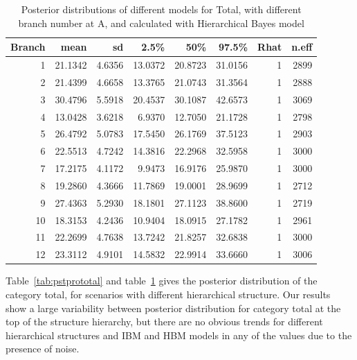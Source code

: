 \begin{table}[!h]
	\centering
	\begin{tabular}{rrrrrrrr}
		\hline
		Branch & mean & sd & 2.5\% & 50\% & 97.5\% & Rhat & n.eff \\ 
		\hline
		1 & 21.1342 & 4.6356 & 13.0372 & 20.8723 & 31.0156 & 1 & 2899 \\ 
		2 & 21.4399 & 4.6658 & 13.3765 & 21.0743 & 31.3564 & 1 & 2888 \\ 
		3 & 30.4796 & 5.5918 & 20.4537 & 30.1087 & 42.6573 & 1 & 3069 \\ 
		4 & 13.0428 & 3.6218 & 6.9370 & 12.7050 & 21.1728 & 1 & 2798 \\ 
		5 & 26.4792 & 5.0783 & 17.5450 & 26.1769 & 37.5123 & 1 & 2903 \\ 
		6 & 22.5513 & 4.7242 & 14.3816 & 22.2968 & 32.5958 & 1 & 3000 \\ 
		7 & 17.2175 & 4.1172 & 9.9473 & 16.9176 & 25.9870 & 1 & 3000 \\ 
		8 & 19.2860 & 4.3666 & 11.7869 & 19.0001 & 28.9699 & 1 & 2712 \\ 
		9 & 27.4363 & 5.2930 & 18.1801 & 27.1123 & 38.8600 & 1 & 2719 \\ 
		10 & 18.3153 & 4.2436 & 10.9404 & 18.0915 & 27.1782 & 1 & 2961 \\ 
		11 & 22.2699 & 4.7638 & 13.7242 & 21.8257 & 32.6838 & 1 & 3000 \\ 
		12 & 23.3112 & 4.9101 & 14.5832 & 22.9914 & 33.6660 & 1 & 3006 \\ 
		\hline
	\end{tabular}
	\caption{Posterior distributions of different models for Total, with different branch number at A, and calculated with Hierarchical Bayes model} 
	\label{tab:pstprototalh}
\end{table}

Table~\ref{tab:pstprototal} and table~\ref{tab:pstprototalh} gives the posterior distribution of the category total, for scenarios with different hierarchical structure. Our results show a large variability between posterior distribution for category total at the top of the structure hierarchy, but there are no obvious trends for different hierarchical structures and IBM and HBM models in any of the values due to the presence of noise. 

\newpage

